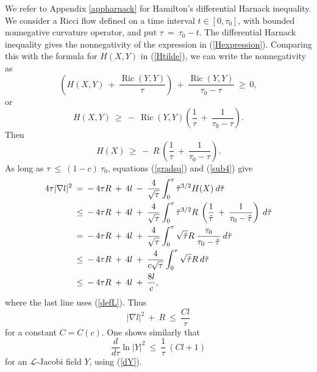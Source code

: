 \documentclass[12pt]{amsart}
\newcommand{\Ric}{\operatorname{Ric}}
\numberwithin{equation}{section}
\theoremstyle{plain}
\theoremstyle{definition}
\theoremstyle{remark}
\begin{document}
We refer to Appendix \ref{appharnack} for
Hamilton's differential Harnack inequality.  We consider a Ricci flow defined on
a  time interval $t \in [0, \tau_0]$, with bounded nonnegative curvature operator,
and put $\tau \: = \: \tau_0 - t$. The differential Harnack inequality gives the
nonnegativity of the expression in (\ref{Hexpression}). 
Comparing this with the formula for $H(X,Y)$ in (\ref{Htilde}), we can write
the nonnegativity as
\begin{equation}
\left( H(X, Y) \: + \: \frac{\Ric(Y,Y)}{\tau} \right) \: + \: 
\frac{\Ric(Y,Y)}{\tau_0 - \tau} \: \ge \: 0,
\end{equation}  
or
\begin{equation} \label{ineqtoshow}
H(X, Y) \: \ge \: - \: \Ric(Y, Y) \left( \frac{1}{\tau} \: + \: 
\frac{1}{\tau_0 - \tau} \right).
\end{equation}
Then
\begin{equation}
H(X) \: \ge \: - \: R \: \left( \frac{1}{\tau} \: + \:
\frac{1}{\tau_0 - \tau} \right).
\end{equation}
As long as $\tau \: \le \: (1-c) \: \tau_0$, equations (\ref{gradsq}) and (\ref{sub4})
give
\begin{align}
4 \tau |\nabla l|^2 \: & = \: - \: 4 \tau R \: + \: 4l \: - \:
\frac{4}{\sqrt{\tau}} \int_0^\tau \tilde{\tau}^{3/2} H(X) \: d\tilde{\tau} \\
& \le \: - \: 4 \tau R \: + \: 4l \: + \:
\frac{4}{\sqrt{\tau}} \int_0^\tau \tilde{\tau}^{3/2} R \: 
\left( \frac{1}{\tilde{\tau}} \: + \:
\frac{1}{\tau_0 - \tilde{\tau}} \right)
  \: d\tilde{\tau} \notag \\
& = \: - \: 4 \tau R \: + \: 4l \: + \:
\frac{4}{\sqrt{\tau}} \int_0^\tau \sqrt{\tilde\tau} R \: 
\frac{\tau_0}{\tau_0 - \tilde{\tau}}
\: d\tilde{\tau} \notag \\
& \le \: - \: 4 \tau R \: + \: 4l \: + \:
\frac{4}{c \sqrt{\tau}} \int_0^\tau \sqrt{\tilde\tau} R 
\: d\tilde{\tau} \notag \\
& \le \: - \: 4 \tau R \: + \: 4l \: + \:
\frac{8l}{c}, \notag
\end{align}
where the last line uses (\ref{defL}).
Thus 
\begin{equation} \label{I.(7.16)}
|\nabla l|^2 \: + \: R \: \le \: \frac{Cl}{\tau}
\end{equation}
for a constant $C = C(c)$.
One shows similarly that
\begin{equation}
\frac{d}{d\tau} \ln |Y|^2 \: \le \: \frac{1}{\tau} \: (Cl+1)
\end{equation}
for an ${\mathcal L}$-Jacobi field $Y$, using (\ref{dY}).
\end{document}
